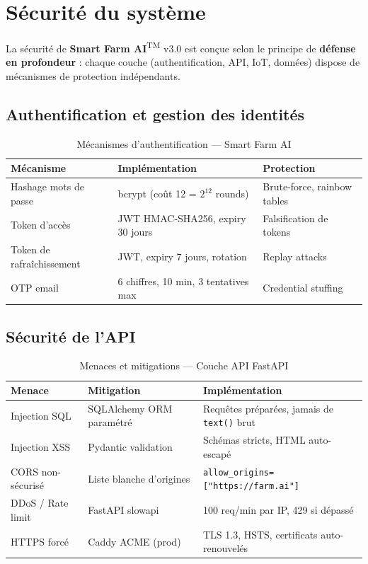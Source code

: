 \documentclass[12pt,a4paper,oneside]{report}
\newcommand{\farmAI}{\textbf{Smart Farm AI}\textsuperscript{TM}}
\newcommand{\code}[1]{\texttt{\small\color{farmgray}#1}}
\begin{document}
\section{Sécurité du système}

La sécurité de \farmAI{} v3.0 est conçue selon le principe de \textbf{défense en
profondeur} : chaque couche (authentification, API, IoT, données) dispose de
mécanismes de protection indépendants.

\subsection{Authentification et gestion des identités}

\begin{table}[H]\centering
\caption{Mécanismes d'authentification — Smart Farm AI}
\label{tab:auth_sec}
\begin{tabular}{lll}
\toprule
\textbf{Mécanisme}&\textbf{Implémentation}&\textbf{Protection}\\
\midrule
Hashage mots de passe & bcrypt (coût 12 = $2^{12}$ rounds)  & Brute-force, rainbow tables \\
Token d'accès         & JWT HMAC-SHA256, expiry 30 jours     & Falsification de tokens \\
Token de rafraîchissement & JWT, expiry 7 jours, rotation    & Replay attacks \\
OTP email             & 6 chiffres, 10 min, 3 tentatives max & Credential stuffing \\
\bottomrule
\end{tabular}
\end{table}

\subsection{Sécurité de l'API}

\begin{table}[H]\centering
\caption{Menaces et mitigations — Couche API FastAPI}
\label{tab:api_sec}
\begin{tabular}{llp{5cm}}
\toprule
\textbf{Menace}&\textbf{Mitigation}&\textbf{Implémentation}\\
\midrule
Injection SQL     & SQLAlchemy ORM paramétré  & Requêtes préparées, jamais de \code{text()} brut \\
Injection XSS     & Pydantic validation       & Schémas stricts, HTML auto-escapé \\
CORS non-sécurisé & Liste blanche d'origines  & \code{allow\_origins=["https://farm.ai"]} \\
DDoS / Rate limit & FastAPI slowapi           & 100 req/min par IP, 429 si dépassé \\
HTTPS forcé       & Caddy ACME (prod)         & TLS 1.3, HSTS, certificats auto-renouvelés \\
\bottomrule
\end{tabular}
\end{table}
\end{document}
